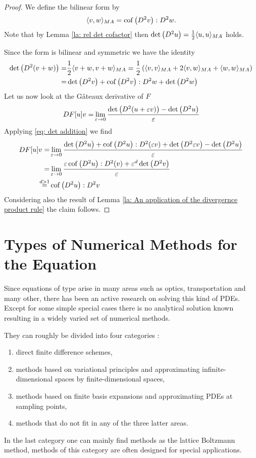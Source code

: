 	\begin{proof}
	We define the \MA bilinear form by
	\[
	 \langle v, w \rangle_{MA} = \operatorname{cof} \left( D^2 v \right):D^2w.
	\]
	Note that by Lemma \ref{la: rel det cofactor} then $\det{\left(D^2 u\right)} = \frac 1 2  \langle u, u \rangle_{MA}$ holds.
	
	Since the \MA form is bilinear and symmetric we have the identity
	\begin{align}
		\det{\left(D^2 (v+w)\right)} =& \frac 1 2  \langle v+w, v+w \rangle_{MA} = \frac 1 2 \left( \langle v, v \rangle_{MA} + 2  \langle v, w \rangle_{MA} +  \langle w, w \rangle_{MA} \right) \nonumber\\
		=&  \det{\left(D^2 v\right)}  + \operatorname{cof} \left( D^2 v \right) : D^2 w + \det{\left(D^2 w\right)} \label{eq: det addition}
	\end{align}
	 Let us now look at the G\^ateaux derivative of $F$
		\begin{align*}
			DF[u]v =& \lim\limits_{\varepsilon \rightarrow 0} \frac { \det{\left(D^2(u+\varepsilon v)\right)} - \det{\left(D^2u\right)}}\varepsilon\\
			\end{align*}
Applying \eqref{eq: det addition} we find
		\begin{align*}
			DF[u]v =& \lim\limits_{\varepsilon \rightarrow 0} 
										\frac  {\det{\left(D^2 u\right)} + \operatorname{cof} \left( D^2 u \right) : D^2(\varepsilon v) + \det{\left(D^2 \varepsilon v\right)} - \det{\left(D^2 u\right)}}
													\varepsilon\\ 
			 =& \lim\limits_{\varepsilon \rightarrow 0} 
										\frac  {\varepsilon \operatorname{cof} \left( D^2 u \right) : D^2(v) + \varepsilon^d \det{\left(D^2 v\right)}}
													\varepsilon\\ 
			\stackrel{d > 1} =& \operatorname{cof} \left( D^2 u \right):D^2v
		\end{align*}
Considering also the result of Lemma \ref{la: An application of the divergernce product rule} the claim follows.
	\end{proof}	


\section{Types of Numerical Methods for the \MA Equation}
Since equations of \MA type arise in many areas such as optics, transportation and many other, there has been an active research on solving this kind of PDEs. Except for some simple special cases there is no analytical solution known resulting in a widely varied set of numerical methods.

They can roughly be divided into four categories \cite[p.210]{FGN2013}: 
\begin{enumerate}
	\item direct finite difference schemes,
	\item methods based on variational principles and approximating infinite-dimensional spaces by finite-dimensional spaces,
	\item methods based on finite basis expansions and approximating PDEs at sampling points,
	\item methods that do not fit in any of the three latter areas.
\end{enumerate}
In the last category one can mainly find methods as the lattice Boltzmann method, methods of this category are often designed for special applications.

